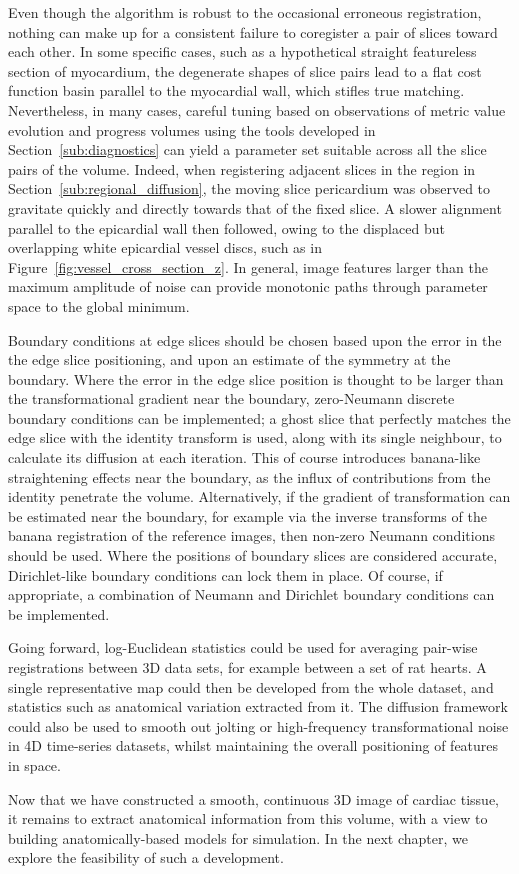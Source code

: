   Even though the algorithm is robust to the occasional erroneous registration, nothing can make up for a consistent failure to coregister a pair of slices toward each other. In some specific cases, such as a hypothetical straight featureless section of myocardium, the degenerate shapes of slice pairs lead to a flat cost function basin parallel to the myocardial wall, which stifles true matching. Nevertheless, in many cases, careful tuning based on observations of metric value evolution and progress volumes using the tools developed in Section~\ref{sub:diagnostics} can yield a parameter set suitable across all the slice pairs of the volume. Indeed, when registering adjacent slices in the region in Section~\ref{sub:regional_diffusion}, the moving slice pericardium was observed to gravitate quickly and directly towards that of the fixed slice. A slower alignment parallel to the epicardial wall then followed, owing to the displaced but overlapping white epicardial vessel discs, such as in Figure~\ref{fig:vessel_cross_section_z}. In general, image features larger than the maximum amplitude of noise can provide monotonic paths through parameter space to the global minimum.
  
  Boundary conditions at edge slices should be chosen based upon the error in the the edge slice positioning, and upon an estimate of the symmetry at the boundary. Where the error in the edge slice position is thought to be larger than the transformational gradient near the boundary, zero-Neumann discrete boundary conditions can be implemented; a ghost slice that perfectly matches the edge slice with the identity transform is used, along with its single neighbour, to calculate its diffusion at each iteration. This of course introduces banana-like straightening effects near the boundary, as the influx of contributions from the identity penetrate the volume. Alternatively, if the gradient of transformation can be estimated near the boundary, for example via the inverse transforms of the banana registration of the reference images, then non-zero Neumann conditions should be used. Where the positions of boundary slices are considered accurate, Dirichlet-like boundary conditions can lock them in place. Of course, if appropriate, a combination of Neumann and Dirichlet boundary conditions can be implemented.
  
  Going forward, log-Euclidean statistics could be used for averaging pair-wise registrations between 3D data sets, for example between a set of rat hearts. A single representative map could then be developed from the whole dataset, and statistics such as anatomical variation extracted from it. The diffusion framework could also be used to smooth out jolting or high-frequency transformational noise in 4D time-series datasets, whilst maintaining the overall positioning of features in space.
  
  Now that we have constructed a smooth, continuous 3D image of cardiac tissue, it remains to extract anatomical information from this volume, with a view to building anatomically-based models for simulation. In the next chapter, we explore the feasibility of such a development.

